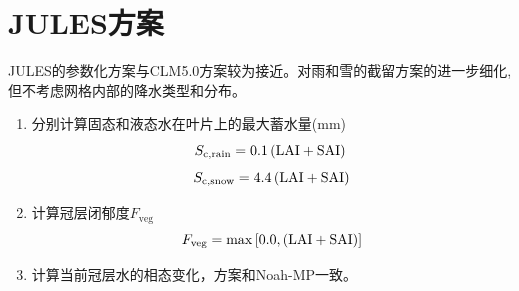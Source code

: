 \section{JULES方案}
JULES的参数化方案与CLM5.0方案较为接近。对雨和雪的截留方案的进一步细化,但不考虑网格内部的降水类型和分布。
\begin{enumerate}
  \item 分别计算固态和液态水在叶片上的最大蓄水量(mm)\\
    \begin{equation}
      S_{\mathrm{c,rain}}=0.1\left({\rm LAI}+{\rm SAI}\right)\\
    \end{equation}
    \begin{equation}
      S_{\mathrm{c,snow}}=4.4\left({\rm LAI}+{\rm SAI}\right)
    \end{equation}
  \item 计算冠层闭郁度$F_{\mathrm{veg}}$
    \begin{equation}
      F_{\mathrm{veg}} = \max\left[0.0,\left({\rm LAI}+{\rm SAI}\right)\right]
    \end{equation}

  \item 计算当前冠层水的相态变化，方案和Noah-MP一致。


\end{enumerate}
